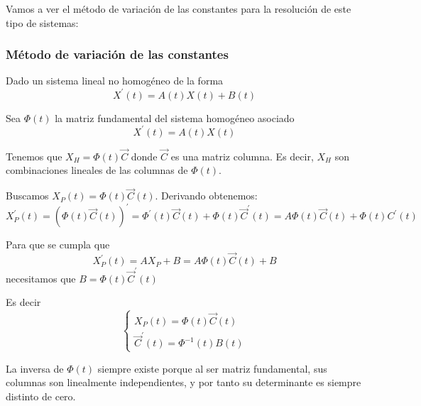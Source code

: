 \documentclass{mathnotes}
\begin{document}
Vamos a ver el método de variación de las constantes para la resolución de este tipo de sistemas:

\subsubsection{Método de variación de las constantes}
Dado un sistema lineal no homogéneo de la forma $$X^\prime(t) = A(t)X(t)+B(t)$$ 

Sea $\Phi(t)$ la matriz fundamental del sistema homogéneo asociado $$X^\prime(t) = A(t)X(t)$$

Tenemos que $X_H = \Phi(t)\vec{C}$ donde $\vec{C}$ es una matriz columna. Es decir, $X_H$ son combinaciones lineales de las columnas de $\Phi(t)$.

Buscamos $X_P(t) = \Phi(t)\vec{C}(t)$. Derivando obtenemos: $$X^\prime_P(t) = (\Phi(t)\vec{C}(t))^\prime = \Phi^\prime(t)\vec{C}(t)+\Phi(t)\vec{C}^\prime(t) = A\Phi(t)\vec{C}(t)+\Phi(t)C^\prime(t)$$

Para que se cumpla que $$X_P^\prime(t) = AX_P+B = A\Phi(t)\vec{C}(t)+B$$ necesitamos que $B = \Phi(t)\vec{C}^\prime(t)$

Es decir
\begin{equation*}
  \left\lbrace
  \begin{array}{l}
     X_P(t) = \Phi(t)\vec{C}(t)\\
     \vec{C}^\prime(t) = \Phi^{-1}(t)B(t)
  \end{array}
  \right.
\end{equation*}

\obs
La inversa de $\Phi(t)$ siempre existe porque al ser matriz fundamental, sus columnas son linealmente independientes, y por tanto su determinante es siempre distinto de cero.
\end{document}
